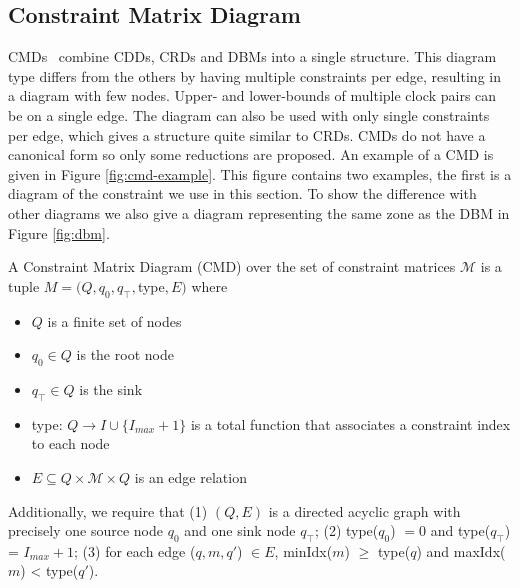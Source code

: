 \subsection{Constraint Matrix Diagram}
CMDs~\cite{5702245} combine CDDs, CRDs and DBMs into a single structure. This diagram type differs from the others by having multiple constraints per edge, resulting in a diagram with few nodes. Upper- and lower-bounds of multiple clock pairs can be on a single edge. The diagram can also be used with only single constraints per edge, which gives a structure quite similar to CRDs. CMDs do not have a canonical form so only some reductions are proposed. An example of a CMD is given in Figure \ref{fig:cmd-example}. This figure contains two examples, the first is a diagram of the constraint we use in this section. To show the difference with other diagrams we also give a diagram representing the same zone as the DBM in Figure \ref{fig:dbm}.
\begin{mydef}
A Constraint Matrix Diagram (CMD) over the set of constraint matrices $\mathcal{M}$ is a tuple $M = (Q,q_0,q_\top,$type$,E)$ where
\begin{itemize}
\item $Q$ is a finite set of nodes
\item $q_0 \in Q$ is the root node
\item $q_\top \in Q$ is the sink
\item type: $Q \rightarrow I \cup \{I_{max} + 1\}$ is a total function that associates a constraint index to each node
\item $E \subseteq Q \times \mathcal{M} \times Q$ is an edge relation
\end{itemize}
Additionally, we require that (1) $(Q,E)$ is a directed acyclic graph with precisely one source node $q_0$ and one sink node $q_\top$; (2) type($q_0$) $= 0$ and type($q_\top$) = $I_{max} + 1$; (3) for each edge ($q,m,q'$) $\in E$, minIdx($m$) $\geq$ type($q$) and maxIdx($m$) < type($q'$). 
\end{mydef}

